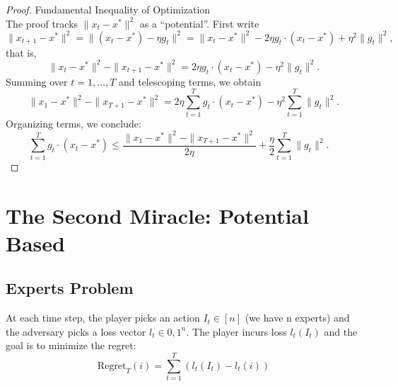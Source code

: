 \documentclass[11pt]{book} %
\begin{document}
\begin{proof}{Fundamental Inequality of Optimization} \\
    The proof tracks \( \|x_t - x^*\|^2 \) as a ``potential''. First write
    \[
    \|x_{t+1} - x^*\|^2 = \|(x_t - x^*) - \eta g_t\|^2 = \|x_t - x^*\|^2 - 2\eta g_t \cdot (x_t - x^*) + \eta^2 \|g_t\|^2,
    \]
    that is,
    \[
    \|x_t - x^*\|^2 - \|x_{t+1} - x^*\|^2 = 2\eta g_t \cdot (x_t - x^*) - \eta^2 \|g_t\|^2.
    \]
    Summing over \( t = 1, \ldots, T \) and telescoping terms, we obtain
    \[
    \|x_1 - x^*\|^2 - \|x_{T+1} - x^*\|^2 = 2\eta \sum_{t=1}^T g_t \cdot (x_t - x^*) - \eta^2 \sum_{t=1}^T \|g_t\|^2.
    \]
    Organizing terms, we conclude:
    \[
    \sum_{t=1}^T g_t \cdot (x_t - x^*) \leq \frac{\|x_1 - x^*\|^2 - \|x_{T+1} - x^*\|^2}{2\eta} + \frac{\eta}{2} \sum_{t=1}^T \|g_t\|^2. \quad 
    \]
\end{proof}

\bigbreak


    


\chapter{The Second Miracle: Potential Based}

\section{Experts Problem}

At each time step, the player picks an action $I_t \in [n]$ (we have n experts) and the adversary picks a loss vector $l_t \in {0,1}^n$. 
The player incurs loss $l_t(I_t)$ and the goal is to minimize the regret:
\begin{equation}
    \text{Regret}_T(i) = \sum_{t=1}^T \left( l_t(I_t) - l_t(i) \right)
\end{equation}
\end{document}
